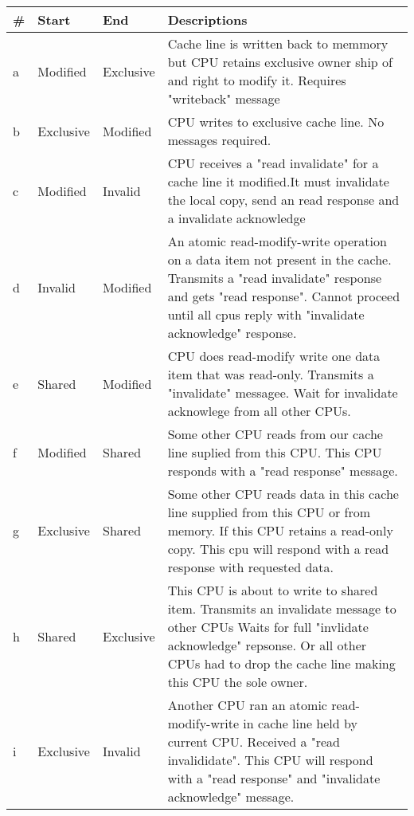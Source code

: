 \documentclass{article}
\begin{document}
\begin{tabular*}{0.75\textwidth} {| l | l | l | p{5cm}| }    
    \hline
    \# & Start  & End   & Descriptions \\
    \hline
    a & Modified  & Exclusive &
    Cache line is written back to memmory but CPU retains exclusive 
    owner ship of and right to modify it. Requires "writeback" 
    message\\
    \hline
    b& Exclusive & Modified &  
    CPU writes to exclusive cache line. No messages required. \\
    \hline
    c & Modified & Invalid &   
    CPU receives a "read invalidate" for a cache line it modified.It 
    must invalidate the local copy, send an read response and a 
    invalidate acknowledge \\
    \hline
    d & Invalid & Modified &
    An atomic read-modify-write operation on a data item not present
    in the cache. Transmits a "read invalidate" response and gets
    "read response". Cannot proceed until all cpus reply with
    "invalidate acknowledge" response.    \\

    \hline
    e & Shared & Modified & 

    CPU does read-modify write one data item that was
    read-only. Transmits a "invalidate" messagee. Wait for invalidate
    acknowlege from all other CPUs.    
    \\
    \hline
    f & Modified & Shared &

    Some other CPU reads from our cache line suplied from this
    CPU. This CPU responds with a "read response" message.    
    \\    
    \hline

    g & Exclusive & Shared & 


    Some other CPU reads data in this cache line supplied from this
    CPU or from memory. If this CPU retains a read-only copy. This cpu
    will respond with a read response with requested data.
    
    \\
    \hline
    h & Shared & Exclusive & 

    This CPU is about to write to shared item. Transmits an invalidate
    message to other CPUs Waits for full "invlidate acknowledge"
    repsonse. Or all other CPUs had to drop the cache line making this
    CPU the sole owner. \\
    \hline
    i & Exclusive & Invalid & 

    Another CPU ran an atomic read-modify-write in cache line held by
    current CPU. Received a "read invalididate". This CPU will respond
    with a "read response" and "invalidate acknowledge" message.   \\


\end{tabular*}
\end{document}

